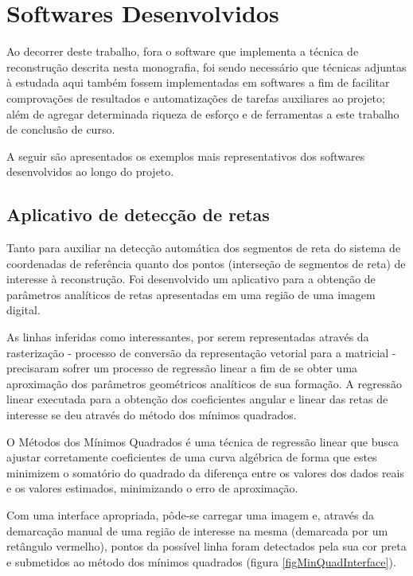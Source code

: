\chapter{Softwares Desenvolvidos}
	\label{capituloSoftwares}

	Ao decorrer deste trabalho, fora o software que implementa a técnica de reconstrução descrita nesta monografia, foi sendo necessário que técnicas adjuntas à estudada aqui também fossem implementadas em softwares a fim de facilitar comprovações de resultados e automatizações de tarefas auxiliares ao projeto; além de agregar determinada riqueza de esforço e de ferramentas a este trabalho de conclusão de curso.
	
	A seguir são apresentados os exemplos mais representativos dos softwares desenvolvidos ao longo do projeto.
	
	\section{Aplicativo de detecção de retas}
		\label{appDeteccaoRetas}
		Tanto para auxiliar na detecção automática dos segmentos de reta do sistema de coordenadas de referência quanto dos pontos (interseção de segmentos de reta) de interesse à reconstrução. Foi desenvolvido um aplicativo para a obtenção de parâmetros analíticos de retas apresentadas em uma região de uma imagem digital.
		
		As linhas inferidas como interessantes, por serem representadas através da rasterização - processo de conversão da representação vetorial para a matricial \cite{compGrafTeoPrat} - precisaram sofrer um processo de regressão linear a fim de se obter uma aproximação dos parâmetros geométricos analíticos de sua formação. A regressão linear executada para a obtenção dos coeficientes angular e linear das retas de interesse se deu através do método dos mínimos quadrados.
	
	O Métodos dos Mínimos Quadrados é uma técnica de regressão linear que busca ajustar corretamente coeficientes de uma curva algébrica de forma que estes minimizem o somatório do quadrado da diferença entre os valores dos dados reais e os valores estimados, minimizando o erro de aproximação.
	
	Com uma interface apropriada, pôde-se carregar uma imagem e, através da demarcação manual de uma região de interesse na mesma (demarcada por um retângulo vermelho), pontos da possível linha foram detectados pela sua cor preta e submetidos ao método dos mínimos quadrados (figura \ref{figMinQuadInterface}).
	
